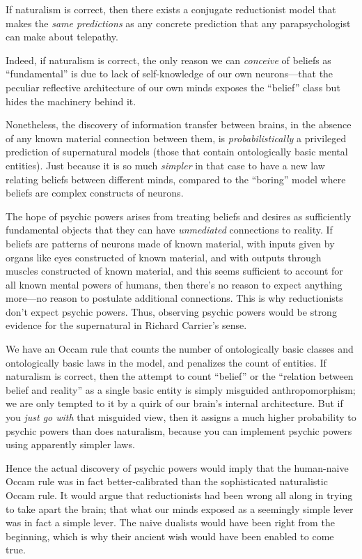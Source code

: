 {
 If naturalism is correct, then there exists a conjugate
reductionist model that makes the \textit{same predictions} as any
concrete prediction that any parapsychologist can make about
telepathy.}

{
 Indeed, if naturalism is correct, the only reason we can
\textit{conceive} of beliefs as
``fundamental'' is due to lack of
self-knowledge of our own neurons---that the peculiar reflective
architecture of our own minds exposes the
``belief'' class but hides the
machinery behind it.}

{
 Nonetheless, the discovery of information transfer between brains,
in the absence of any known material connection between them, is
\textit{probabilistically} a privileged prediction of supernatural
models (those that contain ontologically basic mental entities). Just
because it is so much \textit{simpler} in that case to have a new law
relating beliefs between different minds, compared to the
``boring'' model where beliefs are
complex constructs of neurons.}

{
 The hope of psychic powers arises from treating beliefs and
desires as sufficiently fundamental objects that they can have
\textit{unmediated} connections to reality. If beliefs are patterns of
neurons made of known material, with inputs given by organs like eyes
constructed of known material, and with outputs through muscles
constructed of known material, and this seems sufficient to account for
all known mental powers of humans, then there's no
reason to expect anything more---no reason to postulate additional
connections. This is why reductionists don't expect
psychic powers. Thus, observing psychic powers would be strong evidence
for the supernatural in Richard Carrier's sense.}

{
 We have an Occam rule that counts the number of ontologically
basic classes and ontologically basic laws in the model, and penalizes
the count of entities. If naturalism is correct, then the attempt to
count ``belief'' or the
``relation between belief and
reality'' as a single basic entity is simply
misguided anthropomorphism; we are only tempted to it by a quirk of our
brain's internal architecture. But if you \textit{just
go with} that misguided view, then it assigns a much higher probability
to psychic powers than does naturalism, because you can implement
psychic powers using apparently simpler laws.}

{
 Hence the actual discovery of psychic powers would imply that the
human-naive Occam rule was in fact better-calibrated than the
sophisticated naturalistic Occam rule. It would argue that
reductionists had been wrong all along in trying to take apart the
brain; that what our minds exposed as a seemingly simple lever was in
fact a simple lever. The naive dualists would have been right from the
beginning, which is why their ancient wish would have been enabled to
come true.}

